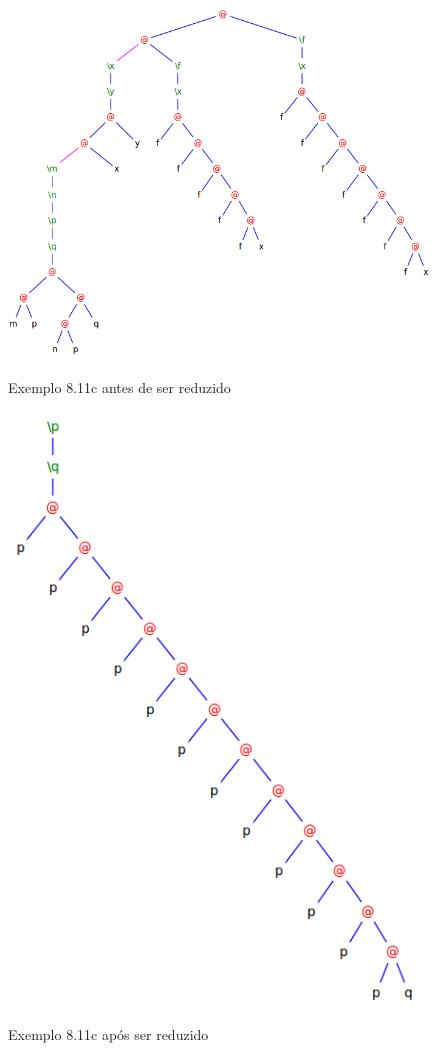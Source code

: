 \documentclass[a4paper]{article}
\begin{document}
\begin{figure}[h]
  \centering
  \includegraphics[scale=0.5]{8-11c_1.png}
  \caption{Exemplo 8.11c antes de ser reduzido}
\end{figure}

\begin{figure}[h]
  \centering
  \includegraphics[scale=0.5]{8-11c_2.png}
  \caption{Exemplo 8.11c após ser reduzido}
\end{figure}
\end{document}
